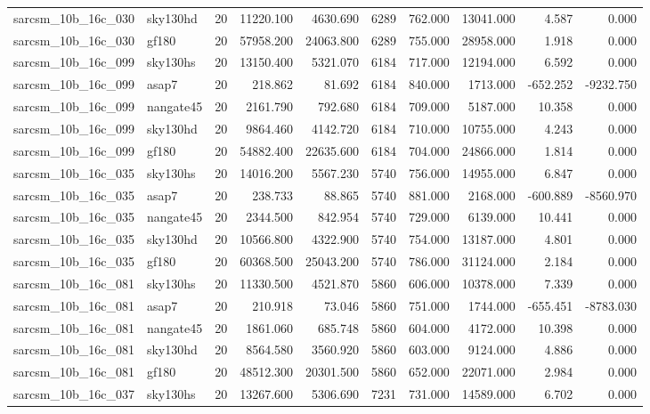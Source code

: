 \begin{longtable}{llrrrrrrrr}
sarcsm\_10b\_16c\_030 & sky130hd & 20 & 11220.100 & 4630.690 & 6289 & 762.000 & 13041.000 & 4.587 & 0.000 \\
sarcsm\_10b\_16c\_030 & gf180 & 20 & 57958.200 & 24063.800 & 6289 & 755.000 & 28958.000 & 1.918 & 0.000 \\
sarcsm\_10b\_16c\_099 & sky130hs & 20 & 13150.400 & 5321.070 & 6184 & 717.000 & 12194.000 & 6.592 & 0.000 \\
sarcsm\_10b\_16c\_099 & asap7 & 20 & 218.862 & 81.692 & 6184 & 840.000 & 1713.000 & -652.252 & -9232.750 \\
sarcsm\_10b\_16c\_099 & nangate45 & 20 & 2161.790 & 792.680 & 6184 & 709.000 & 5187.000 & 10.358 & 0.000 \\
sarcsm\_10b\_16c\_099 & sky130hd & 20 & 9864.460 & 4142.720 & 6184 & 710.000 & 10755.000 & 4.243 & 0.000 \\
sarcsm\_10b\_16c\_099 & gf180 & 20 & 54882.400 & 22635.600 & 6184 & 704.000 & 24866.000 & 1.814 & 0.000 \\
sarcsm\_10b\_16c\_035 & sky130hs & 20 & 14016.200 & 5567.230 & 5740 & 756.000 & 14955.000 & 6.847 & 0.000 \\
sarcsm\_10b\_16c\_035 & asap7 & 20 & 238.733 & 88.865 & 5740 & 881.000 & 2168.000 & -600.889 & -8560.970 \\
sarcsm\_10b\_16c\_035 & nangate45 & 20 & 2344.500 & 842.954 & 5740 & 729.000 & 6139.000 & 10.441 & 0.000 \\
sarcsm\_10b\_16c\_035 & sky130hd & 20 & 10566.800 & 4322.900 & 5740 & 754.000 & 13187.000 & 4.801 & 0.000 \\
sarcsm\_10b\_16c\_035 & gf180 & 20 & 60368.500 & 25043.200 & 5740 & 786.000 & 31124.000 & 2.184 & 0.000 \\
sarcsm\_10b\_16c\_081 & sky130hs & 20 & 11330.500 & 4521.870 & 5860 & 606.000 & 10378.000 & 7.339 & 0.000 \\
sarcsm\_10b\_16c\_081 & asap7 & 20 & 210.918 & 73.046 & 5860 & 751.000 & 1744.000 & -655.451 & -8783.030 \\
sarcsm\_10b\_16c\_081 & nangate45 & 20 & 1861.060 & 685.748 & 5860 & 604.000 & 4172.000 & 10.398 & 0.000 \\
sarcsm\_10b\_16c\_081 & sky130hd & 20 & 8564.580 & 3560.920 & 5860 & 603.000 & 9124.000 & 4.886 & 0.000 \\
sarcsm\_10b\_16c\_081 & gf180 & 20 & 48512.300 & 20301.500 & 5860 & 652.000 & 22071.000 & 2.984 & 0.000 \\
sarcsm\_10b\_16c\_037 & sky130hs & 20 & 13267.600 & 5306.690 & 7231 & 731.000 & 14589.000 & 6.702 & 0.000 \\

\end{longtable}
